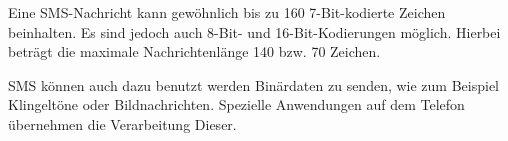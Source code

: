 \documentclass[german,12pt,a4paper]{article}
\begin{document}
Eine SMS-Nachricht kann gewöhnlich bis zu 160 7-Bit-kodierte Zeichen beinhalten. 
Es sind jedoch auch 8-Bit- und 16-Bit-Kodierungen möglich. Hierbei beträgt die 
maximale Nachrichtenlänge 140 bzw. 70 Zeichen\cite{thesms}. 

SMS können auch dazu benutzt werden Binärdaten zu senden, wie zum Beispiel 
Klingeltöne oder Bildnachrichten. Spezielle Anwendungen auf 
dem Telefon übernehmen die Verarbeitung Dieser.


\end{document}
